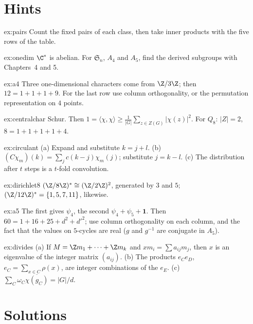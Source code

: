 \section{Hints}

\begin{hint}{ex:pairs}
Count the fixed pairs of each class, then take inner products with the five rows of the table.
\end{hint}
\begin{hint}{ex:onedim}
$\C^*$ is abelian. For $\mathfrak S_n$, $A_4$ and $A_5$, find the derived subgroups with Chapters~4 and 5.
\end{hint}
\begin{hint}{ex:a4}
Three one-dimensional characters come from $\Z/3\Z$; then $12=1+1+1+9$. For the last row use column orthogonality, or the permutation representation on $4$ points.
\end{hint}
\begin{hint}{ex:centralchar}
Schur. Then $1=\langle\chi,\chi\rangle\ge\frac1{|G|}\sum_{z\in Z(G)}|\chi(z)|^2$. For $Q_8$: $|Z|=2$, $8=1+1+1+1+4$.
\end{hint}
\begin{hint}{ex:circulant}
(a) Expand and substitute $k=j+l$. (b) $(C\chi_m)(k)=\sum_jc(k-j)\chi_m(j)$; substitute $j=k-l$. (c) The distribution after $t$ steps is a $t$-fold convolution.
\end{hint}
\begin{hint}{ex:dirichlet8}
$(\Z/8\Z)^*\cong(\Z/2\Z)^2$, generated by $3$ and $5$; $(\Z/12\Z)^*=\{1,5,7,11\}$, likewise.
\end{hint}
\begin{hint}{ex:a5}
The first gives $\psi_4$, the second $\psi_4+\psi_5+\mathbf1$. Then $60=1+16+25+d^2+d'^2$; use column orthogonality on each column, and the fact that the values on $5$-cycles are real ($g$ and $g^{-1}$ are conjugate in $A_5$).
\end{hint}
\begin{hint}{ex:divides}
(a) If $M=\Z m_1+\dots+\Z m_k$ and $xm_i=\sum a_{ij}m_j$, then $x$ is an eigenvalue of the integer matrix $(a_{ij})$. (b) The products $e_Ce_D$, $e_C=\sum_{x\in C}\rho(x)$, are integer combinations of the $e_E$. (c) $\sum_C\omega_C\overline{\chi(g_C)}=|G|/d$.
\end{hint}

\section{Solutions}

